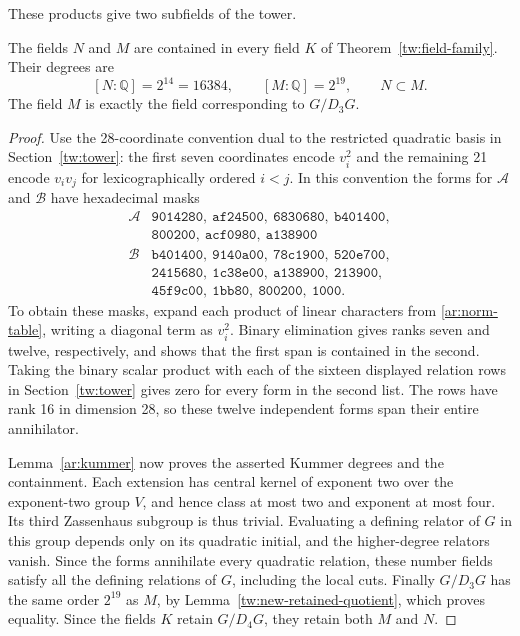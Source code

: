 These products give two subfields of the tower.
\begin{proposition}\label{ar:central-fields}
The fields $N$ and $M$ are contained in every field $K$ of
Theorem~\ref{tw:field-family}. Their degrees are
\[
 [N:\mathbb Q]=2^{14}=16384,\qquad [M:\mathbb Q]=2^{19},\qquad N\subset M.
\]
The field $M$ is exactly the field corresponding to $G/D_3G$.
\end{proposition}
\begin{proof}
Use the 28-coordinate convention dual to the restricted quadratic basis
in Section~\ref{tw:tower}: the first seven coordinates encode $v_i^2$
and the remaining 21 encode $v_iv_j$ for lexicographically ordered
$i<j$. In this convention the forms for $\mathcal A$ and $\mathcal B$
have hexadecimal masks
\begin{equation}\label{ar:central-masks}
\begin{array}{c|l}
\mathcal A&
\texttt{9014280},\ \texttt{af24500},\ \texttt{6830680},\ \texttt{b401400},\\
&\texttt{800200},\ \texttt{acf0980},\ \texttt{a138900}\\[2pt]
\mathcal B&
\texttt{b401400},\ \texttt{9140a00},\ \texttt{78c1900},\ \texttt{520e700},\\
&\texttt{2415680},\ \texttt{1c38e00},\ \texttt{a138900},\ \texttt{213900},\\
&\texttt{45f9c00},\ \texttt{1bb80},\ \texttt{800200},\ \texttt{1000}.
\end{array}
\end{equation}
To obtain these masks, expand each product of linear characters from
\eqref{ar:norm-table}, writing a diagonal term as $v_i^2$.
Binary elimination gives ranks seven and twelve, respectively, and
shows that the first span is contained in the second. Taking the binary
scalar product with each of the sixteen displayed relation rows in
Section~\ref{tw:tower} gives zero for every form in the second list.
The rows have rank 16 in dimension 28, so these twelve independent forms
span their entire annihilator.

Lemma~\ref{ar:kummer} now proves the asserted Kummer degrees and the
containment. Each extension has central kernel of exponent two over the
exponent-two group $V$, and hence class at most two and exponent at most
four. Its third Zassenhaus subgroup is thus trivial. Evaluating a defining
relator of $G$ in this group depends only on its quadratic initial, and
the higher-degree relators vanish. Since the forms annihilate every
quadratic relation, these number fields satisfy all the defining
relations of $G$, including the local cuts. Finally
$G/D_3G$ has the same order $2^{19}$ as $M$, by
Lemma~\ref{tw:new-retained-quotient}, which proves equality. Since the
fields $K$ retain $G/D_4G$, they retain both $M$ and $N$.
\end{proof}


